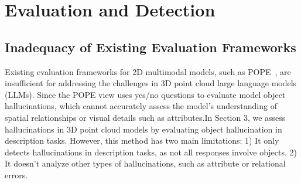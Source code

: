 \makeatletter
\renewcommand{\subsubsection}[1]{%
  \par\noindent\textbf{#1}\par %
}
\makeatother

\section{Evaluation and Detection}\label{sec::exp}




\subsection{ Inadequacy of Existing Evaluation Frameworks}
Existing evaluation frameworks for 2D multimodal models, such as POPE~\cite{li2023evaluating}, are insufficient for addressing the challenges in 3D point cloud large language models (LLMs). Since the POPE view uses yes/no questions to evaluate model object hallucinations, which cannot accurately assess the model's understanding of spatial relationships or visual details such as attributes.In Section 3, we assess hallucinations in 3D point cloud models by evaluating object hallucination in description tasks. However, this method has two main limitations: 1) It only detects hallucinations in description tasks, as not all responses involve objects. 2) It doesn't analyze other types of hallucinations, such as attribute or relational errors.

